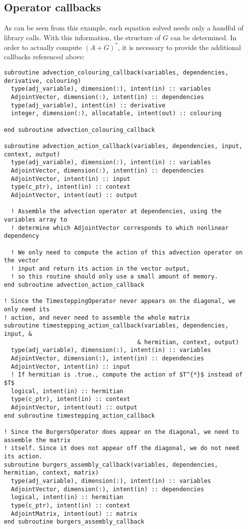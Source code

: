 \documentclass[10pt,authoryear]{elsarticle}
\begin{document}
\subsection{Operator callbacks}
As can be seen from this example, each equation solved needs only a handful of library calls.
With this information, the structure of $G$ can be determined. In order to actually compute
$(A + G)^{*}$, it is necessary to provide the additional callbacks referenced above:

\begin{verbatim}
subroutine advection_colouring_callback(variables, dependencies, derivative, colouring)
  type(adj_variable), dimension(:), intent(in) :: variables
  AdjointVector, dimension(:), intent(in) :: dependencies
  type(adj_variable), intent(in) :: derivative
  integer, dimension(:), allocatable, intent(out) :: colouring

end subroutine advection_colouring_callback

subroutine advection_action_callback(variables, dependencies, input, context, output)
  type(adj_variable), dimension(:), intent(in) :: variables
  AdjointVector, dimension(:), intent(in) :: dependencies
  AdjointVector, intent(in) :: input
  type(c_ptr), intent(in) :: context
  AdjointVector, intent(out) :: output

  ! Assemble the advection operator at dependencies, using the variables array to 
  ! determine which AdjointVector corresponds to which nonlinear dependency

  ! We only need to compute the action of this advection operator on the vector 
  ! input and return its action in the vector output,
  ! so this routine should only use a small amount of memory.
end subroutine advection_action_callback

! Since the TimesteppingOperator never appears on the diagonal, we only need its
! action, and never need to assemble the whole matrix
subroutine timestepping_action_callback(variables, dependencies, input, &
                                      & hermitian, context, output)
  type(adj_variable), dimension(:), intent(in) :: variables
  AdjointVector, dimension(:), intent(in) :: dependencies
  AdjointVector, intent(in) :: input
  ! If hermitian is .true., compute the action of $T^{*}$ instead of $T$
  logical, intent(in) :: hermitian
  type(c_ptr), intent(in) :: context
  AdjointVector, intent(out) :: output
end subroutine timestepping_action_callback

! Since the BurgersOperator does appear on the diagonal, we need to assemble the matrix
! itself. Since it does not appear off the diagonal, we do not need its action.
subroutine burgers_assembly_callback(variables, dependencies, hermitian, context, matrix)
  type(adj_variable), dimension(:), intent(in) :: variables
  AdjointVector, dimension(:), intent(in) :: dependencies
  logical, intent(in) :: hermitian
  type(c_ptr), intent(in) :: context
  AdjointMatrix, intent(out) :: matrix
end subroutine burgers_assembly_callback
\end{verbatim}
\end{document}
